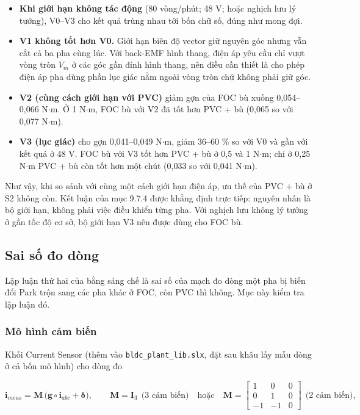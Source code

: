 \begin{itemize}[leftmargin=*]
\item \textbf{Khi giới hạn không tác động} (80 vòng/phút; 48 V; hoặc nghịch lưu lý tưởng), V0–V3 cho kết quả trùng nhau tới bốn chữ số, đúng như mong đợi.
\item \textbf{V1 không tốt hơn V0.} Giới hạn biên độ vector giữ nguyên góc nhưng vẫn cắt cả ba pha cùng lúc. Với back-EMF hình thang, điện áp yêu cầu chỉ vượt vòng tròn $V_m$ ở các góc gần đỉnh hình thang, nên điều cần thiết là cho phép điện áp pha dùng phần lục giác nằm ngoài vòng tròn chứ không phải giữ góc.
\item \textbf{V2 (cùng cách giới hạn với PVC)} giảm gợn của FOC bù xuống 0,054–0,066 N$\cdot$m. Ở 1 N$\cdot$m, FOC bù với V2 đã tốt hơn PVC + bù (0,065 so với 0,077 N$\cdot$m).
\item \textbf{V3 (lục giác)} cho gợn 0,041–0,049 N$\cdot$m, giảm 36–60 \% so với V0 và gần với kết quả ở 48 V. FOC bù với V3 tốt hơn PVC + bù ở 0,5 và 1 N$\cdot$m; chỉ ở 0,25 N$\cdot$m PVC + bù còn tốt hơn một chút (0,033 so với 0,041 N$\cdot$m).
\end{itemize}

Như vậy, khi so sánh với cùng một cách giới hạn điện áp, ưu thế của PVC + bù ở S2 không còn. Kết luận của mục 9.7.4 được khẳng định trực tiếp: nguyên nhân là bộ giới hạn, không phải việc điều khiển từng pha. Với nghịch lưu không lý tưởng ở gần tốc độ cơ sở, bộ giới hạn V3 nên được dùng cho FOC bù.

\subsection{Sai số đo dòng}\label{sec:9.9}

Lập luận thứ hai của bằng sáng chế là sai số của mạch đo dòng một pha bị biến đổi Park trộn sang các pha khác ở FOC, còn PVC thì không. Mục này kiểm tra lập luận đó.

\subsubsection{Mô hình cảm biến}\label{sec:9.9.1}

Khối Current Sensor (thêm vào \texttt{bldc\_plant\_lib.slx}, đặt sau khâu lấy mẫu dòng ở cả bốn mô hình) cho dòng đo

\begin{equation}
\mathbf{i}_{meas} = \mathbf{M}\,\big(\mathbf{g} \circ \mathbf{i}_{abc} + \boldsymbol{\delta}\big), \qquad
\mathbf{M} = \mathbf{I}_3 \ \ \text{(3 cảm biến)} \quad\text{hoặc}\quad
\mathbf{M} = \begin{bmatrix} 1 & 0 & 0 \\ 0 & 1 & 0 \\ -1 & -1 & 0 \end{bmatrix} \ \ \text{(2 cảm biến)},
\tag{9.14}\label{eq:9.14}
\end{equation}

